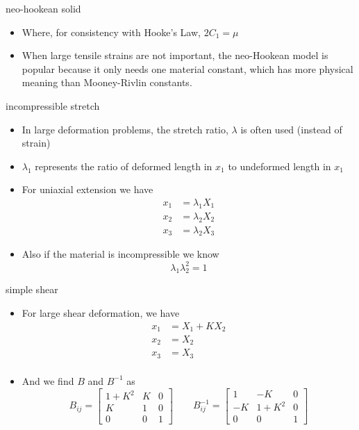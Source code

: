 \documentclass[
  letterpaper,
  ignorenonframetext,
  aspectratio=43,
  handout,
  12pt]{beamer}
\providecommand{\tightlist}{%
  \setlength{\itemsep}{0pt}\setlength{\parskip}{0pt}}
\providecommand{\tightlist}{%
\setlength{\itemsep}{0pt}\setlength{\parskip}{0pt}}
\begin{document}
\begin{frame}{neo-hookean solid}
\protect\hypertarget{neo-hookean-solid-1}{}
\begin{itemize}
\tightlist
\item
  Where, for consistency with Hooke's Law, \(2 C_1 = \mu\)
\item
  When large tensile strains are not important, the neo-Hookean model is
  popular because it only needs one material constant, which has more
  physical meaning than Mooney-Rivlin constants.
\end{itemize}
\end{frame}

\begin{frame}{incompressible stretch}
\protect\hypertarget{incompressible-stretch}{}
\begin{itemize}
\item
  In large deformation problems, the stretch ratio, \(\lambda\) is often
  used (instead of strain)
\item
  \(\lambda_1\) represents the ratio of deformed length in \(x_1\) to
  undeformed length in \(x_1\)
\item
  For uniaxial extension we have \[\begin{aligned}
    x_1 &= \lambda_1 X_1\\
    x_2 &= \lambda_2 X_2\\
    x_3 &= \lambda_2 X_3
  \end{aligned}\]
\item
  Also if the material is incompressible we know
  \[\lambda_1 \lambda_2^2 = 1\]
\end{itemize}
\end{frame}

\begin{frame}{simple shear}
\protect\hypertarget{simple-shear}{}
\begin{itemize}
\item
  For large shear deformation, we have \[\begin{aligned}
    x_1 &= X_1 + KX_2\\
    x_2 &= X_2\\
    x_3 &= X_3\\
  \end{aligned}\]
\item
  And we find \(B\) and \(B^{-1}\) as \[B_{ij} = \begin{bmatrix}
    1+K^2 & K & 0\\
    K & 1 & 0\\
    0 & 0 & 1
  \end{bmatrix} \qquad B_{ij}^{-1} = \begin{bmatrix}
    1 & -K & 0\\
    -K & 1+ K^2 & 0\\
    0 & 0 & 1
  \end{bmatrix}\]
\end{itemize}
\end{frame}
\end{document}
